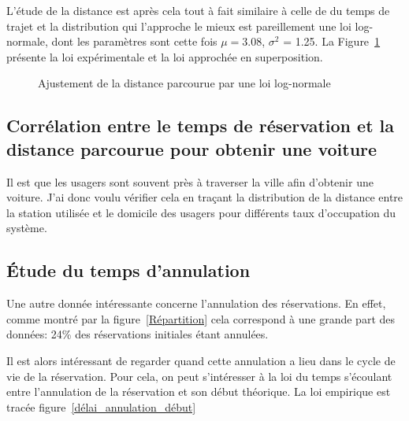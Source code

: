 \documentclass[12pt,a4paper]{article}
\newcommand{\1}[1]{\mathbbm{1}_{\{#1\}} }
\theoremstyle{definition}
\begin{document}
{L'étude de la distance est après cela tout à fait similaire à celle de du temps de trajet et la distribution qui l'approche le mieux est pareillement une loi log-normale, dont les paramètres sont cette fois $\mu = 3.08 $, $\sigma^2$ = 1.25. La Figure~\ref{Ajustement_distance} présente la loi expérimentale et la loi approchée en superposition.

\begin{figure}[!h]
\centering
{}
\caption{Ajustement de la distance parcourue par une loi log-normale}
\label{Ajustement_distance}
\end{figure}

\subsection{Corrélation entre le temps de réservation et la distance parcourue pour obtenir une voiture}

Il est que les usagers sont souvent près à traverser la ville afin d'obtenir une voiture. J'ai donc voulu vérifier cela en traçant la distribution de la distance entre la station utilisée et le domicile des usagers pour différents taux d'occupation du système.
\subsection{Étude du temps d'annulation}



Une autre donnée intéressante concerne l'annulation des réservations. En effet, comme montré par la figure~\ref{Répartition} cela correspond à une grande part des données: 24\% des réservations initiales étant annulées. 

Il est alors intéressant de regarder quand cette annulation a lieu dans le cycle de vie de la réservation. Pour cela, on peut s'intéresser à la loi du temps s'écoulant entre l'annulation de la réservation et son début théorique. La loi empirique est tracée figure~\ref{délai_annulation_début} 

}
\end{document}
